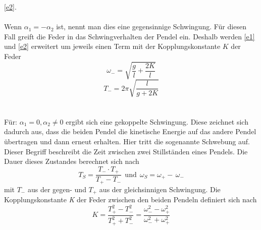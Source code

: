 \eqref{e2}.
\\
\\
Wenn $\alpha_{1} = -\alpha_{2}$ ist, nennt man dies eine gegensinnige Schwingung. Für diesen Fall greift die Feder in das Schwingverhalten
der Pendel ein. Deshalb werden \eqref{e1} und \eqref{e2} erweitert um jeweils einen Term mit der Kopplungskonstante $\textit{K}$
der Feder
\begin{equation}
  \omega_{-} = \sqrt{\frac{g}{l} + \frac{2 K}{l}}
  \label{e3}
\end{equation}
\begin{equation}
  \textit{T}_{-} = 2\pi  \sqrt{\frac{l}{g + 2 \textit{K}}}
  \label{e4}
\end{equation}
\\
\\
Für: $\alpha_{1} = 0, \alpha_{2} \neq 0$ ergibt sich eine gekoppelte Schwingung. Diese zeichnet sich dadurch aus, dass die beiden
Pendel die kinetische Energie auf das andere Pendel übertragen und dann erneut erhalten. Hier tritt die sogenannte Schwebung auf.
Dieser Begriff beschreibt die Zeit zwischen zwei Stillständen eines Pendels. Die Dauer dieses Zustandes berechnet sich nach
\begin{equation}
  \textit{T}_{S} = \frac{\textit{T}_{-} \cdot \textit{T}_{+}}{\textit{T}_{+} - \textit{T}_{-}}
  \ \ \text{und} \ \ \omega_{S} = \omega_{+} - \, \omega_{-}
  \label{e5}
\end{equation}
mit $\textit{T}_{-}$ aus der gegen- und $\textit{T}_{+}$ aus der gleichsinnigen Schwingung. Die Kopplungskonstante \textit{K}
der Feder zwischen den beiden Pendeln definiert sich nach
\begin{equation}
  \textit{K} = \frac{\textit{T}_{+}^{2} - \textit{T}_{-}^{2}}{\textit{T}_{+}^{2} + \textit{T}_{-}^{2}} =
  \frac{\omega_{-}^{2} - \omega_{+}^{2}}{\omega_{-}^{2} + \omega_{+}^{2}}
  \label{e6}
\end{equation}
